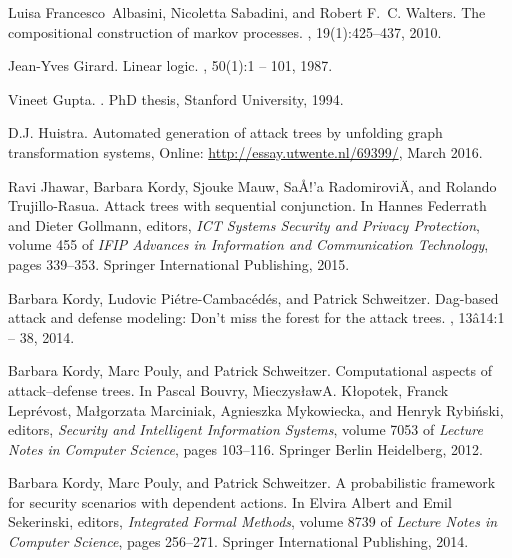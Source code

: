 \documentclass{sigplanconf}
\begin{document}
\begin{thebibliography}{10}
Luisa Francesco~Albasini, Nicoletta Sabadini, and Robert F.~C. Walters.
\newblock The compositional construction of markov processes.
, 19(1):425--437, 2010.

Jean-Yves Girard.
\newblock Linear logic.
, 50(1):1 -- 101, 1987.

Vineet Gupta.
.
\newblock PhD thesis, Stanford University, 1994.

D.J. {Huistra}.
\newblock Automated generation of attack trees by unfolding graph
  transformation systems, Online: \url{http://essay.utwente.nl/69399/}, March 2016.

Ravi Jhawar, Barbara Kordy, Sjouke Mauw, Sa{\AA}{!'}a Radomirovi{\"A}, and
  Rolando Trujillo-Rasua.
\newblock Attack trees with sequential conjunction.
\newblock In Hannes Federrath and Dieter Gollmann, editors, {\em ICT Systems
  Security and Privacy Protection}, volume 455 of {\em IFIP Advances in
  Information and Communication Technology}, pages 339--353. Springer
  International Publishing, 2015.

Barbara Kordy, Ludovic Pi{\'e}tre-Cambac{\'e}d{\'e}s, and Patrick Schweitzer.
\newblock Dag-based attack and defense modeling: Don't miss the forest for the
  attack trees.
, 13{\^a}14:1 -- 38, 2014.

Barbara Kordy, Marc Pouly, and Patrick Schweitzer.
\newblock Computational aspects of attack--defense trees.
\newblock In Pascal Bouvry, Mieczys{\l}awA. K{\l}opotek, Franck Lepr{\'e}vost,
  Ma{\l}gorzata Marciniak, Agnieszka Mykowiecka, and Henryk Rybi{\'n}ski,
  editors, {\em Security and Intelligent Information Systems}, volume 7053 of
  {\em Lecture Notes in Computer Science}, pages 103--116. Springer Berlin
  Heidelberg, 2012.

Barbara Kordy, Marc Pouly, and Patrick Schweitzer.
\newblock A probabilistic framework for security scenarios with dependent
  actions.
\newblock In Elvira Albert and Emil Sekerinski, editors, {\em Integrated Formal
  Methods}, volume 8739 of {\em Lecture Notes in Computer Science}, pages
  256--271. Springer International Publishing, 2014.


\end{thebibliography}
\end{document}
